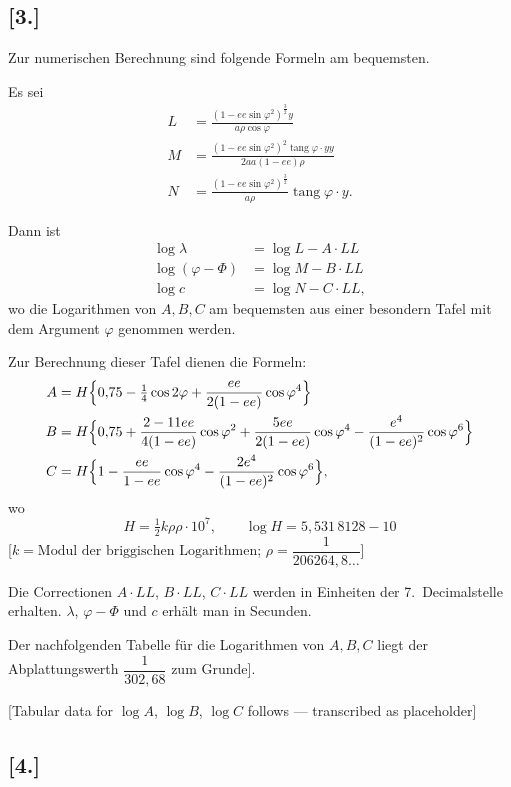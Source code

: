 \documentclass[12pt,a4paper]{article}
\newcommand{\tang}{\operatorname{tang}}
\begin{document}
\subsection*{[3.]}

Zur numerischen Berechnung sind folgende Formeln am bequemsten.

Es sei
\begin{align*}
L &= \frac{(1-ee\sin\varphi^2)^{\frac{3}{2}}y}{a\rho\cos\varphi}\\
M &= \frac{(1-ee\sin\varphi^2)^2\tang\varphi\cdot yy}{2aa(1-ee)\rho}\\
N &= \frac{(1-ee\sin\varphi^2)^{\frac{3}{2}}}{a\rho}\tang\varphi\cdot y.
\end{align*}

Dann ist
\begin{align*}
\log\lambda &= \log L - A\cdot LL\\
\log(\varphi-\Phi) &= \log M - B\cdot LL\\
\log c &= \log N - C\cdot LL,
\end{align*}
wo die Logarithmen von $A,B,C$ am bequemsten aus einer besondern Tafel mit dem Argument $\varphi$ genommen werden.

Zur Berechnung dieser Tafel dienen die Formeln:
\begin{align*}
A &= H\Bigl\{0{,}75 - \tfrac{1}{4}\cos2\varphi + \frac{ee}{2(1-ee)}\cos\varphi^4\Bigr\}\\
B &= H\Bigl\{0{,}75 + \frac{2-11ee}{4(1-ee)}\cos\varphi^2 + \frac{5ee}{2(1-ee)}\cos\varphi^4 - \frac{e^4}{(1-ee)^2}\cos\varphi^6\Bigr\}\\
C &= H\Bigl\{1 - \frac{ee}{1-ee}\cos\varphi^4 - \frac{2e^4}{(1-ee)^2}\cos\varphi^6\Bigr\},
\end{align*}
wo
\[
H = \tfrac{1}{2}k\rho\rho\cdot10^7,\qquad \log H = 5{,}531\,8128-10
\]
[$k = \text{Modul der briggischen Logarithmen}$; $\rho = \dfrac{1}{206264{,}8\ldots}$]

Die Correctionen $A\cdot LL$, $B\cdot LL$, $C\cdot LL$ werden in Einheiten der 7.~Decimalstelle erhalten. $\lambda$, $\varphi-\Phi$ und $c$ erhält man in Secunden.

Der nachfolgenden Tabelle für die Logarithmen von $A,B,C$ liegt der Abplattungswerth $\dfrac{1}{302{,}68}$ zum Grunde].

[Tabular data for $\log A$, $\log B$, $\log C$ follows --- transcribed as placeholder]

\subsection*{[4.]}
\end{document}
